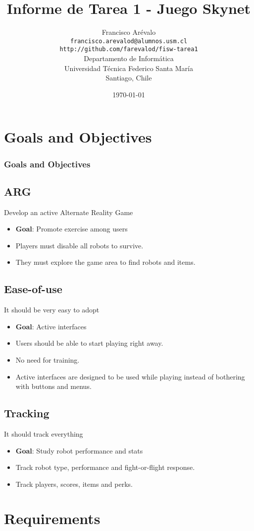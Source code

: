 \documentclass{beamer}
\title{Informe de Tarea 1 - Juego Skynet}
\author{Francisco Ar\'evalo\\
  \texttt{francisco.arevalod@alumnos.usm.cl}\\
  \texttt{http://github.com/farevalod/fisw-tarea1}\\
  \vspace{10mm}
  Departamento de Inform\'atica\\
  Universidad T\'ecnica Federico Santa Mar\'ia\\
  Santiago, Chile}
\date{\today}
\begin{document}
\maketitle
\tableofcontents
\section{Goals and Objectives}
\begin{frame}
\frametitle{Goals and Objectives}
\subsection{ARG}
Develop an active Alternate Reality Game
\begin{itemize}
	\item \textbf{Goal}: Promote exercise among users
	\item Players must disable all robots to survive. 
	\item They must explore the game area to find robots and items.
\end{itemize}
\subsection{Ease-of-use}
It should be very easy to adopt
\begin{itemize}
	\item \textbf{Goal}: Active interfaces
	\item Users should be able to start playing right away. 
	\item No need for training.
	\item Active interfaces are designed to be used while playing instead of bothering with buttons and menus.
\end{itemize}
\subsection{Tracking}
It should track everything
\begin{itemize}
	\item \textbf{Goal}: Study robot performance and stats
	\item Track robot type, performance and fight-or-flight response.
	\item Track players, scores, items and perks.
\end{itemize}
\end{frame}
\section{Requirements}
\end{document}
